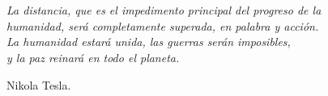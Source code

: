 \chapter*{}
\setlength{\leftmargin}{0.5\textwidth}
\setlength{\parsep}{0cm}
\addtolength{\topsep}{0.5cm}
\begin{flushright}
\small\em{
La distancia, que es el impedimento principal del progreso de la \\ humanidad, será completamente superada, en palabra y acción.\\
La humanidad estará unida, las guerras serán imposibles, \\
y la paz reinará en todo el planeta.
}
\end{flushright}
\begin{flushright}
\small{
Nikola Tesla.
}
\end{flushright}
\cleardoublepage %
